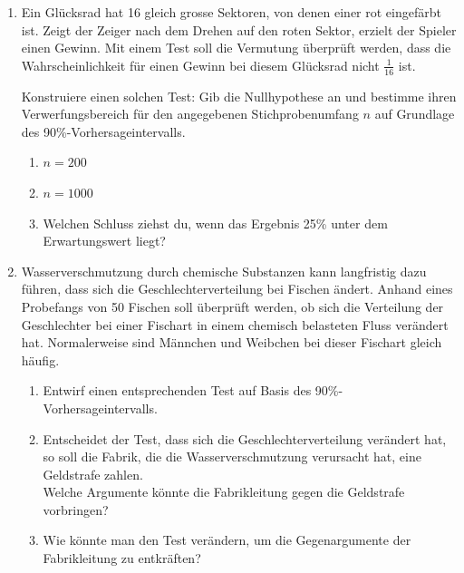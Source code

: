 \begin{ueb}{}{}
    \begin{enumerate}
        \item Ein Glücksrad hat 16 gleich grosse Sektoren, von denen einer rot eingefärbt ist.
              Zeigt der Zeiger nach dem Drehen auf den roten Sektor, erzielt der Spieler einen Gewinn.
              Mit einem Test soll die Vermutung überprüft werden, dass die Wahrscheinlichkeit für einen Gewinn bei diesem Glücksrad nicht \( \frac{1}{16} \) ist.

              Konstruiere einen solchen Test: Gib die Nullhypothese an und bestimme ihren Verwerfungsbereich für den angegebenen Stichprobenumfang \( n \) auf Grundlage des 90\%-Vorhersageintervalls.
              \begin{enumerate}
                  \item \( n = 200 \)
                  \item \( n = 1000 \)
                  \item Welchen Schluss ziehst du, wenn das Ergebnis 25\% unter dem Erwartungswert liegt?
              \end{enumerate}

        \item Wasserverschmutzung durch chemische Substanzen kann langfristig dazu führen, dass sich die Geschlechterverteilung bei Fischen ändert.
              Anhand eines Probefangs von 50 Fischen soll überprüft werden, ob sich die Verteilung der Geschlechter bei einer Fischart in einem chemisch belasteten Fluss verändert hat.
              Normalerweise sind Männchen und Weibchen bei dieser Fischart gleich häufig.
              \begin{enumerate}
                  \item Entwirf einen entsprechenden Test auf Basis des 90\%-Vorhersageintervalls.
                  \item Entscheidet der Test, dass sich die Geschlechterverteilung verändert hat, so soll die Fabrik, die die Wasserverschmutzung verursacht hat, eine Geldstrafe zahlen. \\
                        Welche Argumente könnte die Fabrikleitung gegen die Geldstrafe vorbringen?
                  \item Wie könnte man den Test verändern, um die Gegenargumente der Fabrikleitung zu entkräften?
              \end{enumerate}
    \end{enumerate}

\end{ueb}

